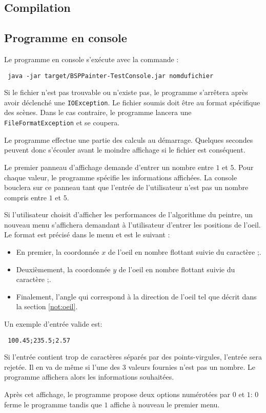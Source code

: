 \subsection{Compilation}
\subsection{Programme en console}
Le programme en console s'exécute avec la commande :
\begin{center}
  \texttt{
    java -jar target/BSPPainter-TestConsole.jar nomdufichier
  }
\end{center}

Si le fichier n'est pas trouvable ou n'existe pas, le programme
s'arrêtera après avoir déclenché une \texttt{IOException}.
Le fichier soumis doit être au format spécifique des scènes.
Dans le cas contraire, le programme lancera une \texttt{FileFormatException}
et se coupera.

Le programme effectue une partie des calculs au démarrage.
Quelques secondes peuvent donc s'écouler avant le moindre affichage
si le fichier est conséquent.

Le premier panneau d'affichage demande d'entrer un
nombre entre $1$ et $5$. Pour chaque valeur, le programme
spécifie les informations affichées.
La console bouclera sur ce panneau tant que
l'entrée de l'utilisateur n'est pas un nombre
compris entre $1$ et $5$.

Si l'utilisateur choisit d'afficher les performances de l'algorithme
du peintre, un nouveau menu s'affichera demandant à l'utilisateur
d'entrer les positions de l'oeil. Le format est précisé
dans le menu et est le suivant :
\begin{itemize}
\item En premier, la coordonnée $x$ de l'oeil en nombre
  flottant suivie du caractère \og;\fg{}.
\item Deuxièmement, la coordonnée $y$ de l'oeil en
  nombre flottant suivie du caractère \og;\fg.
\item Finalement, l'angle qui correspond à la direction
  de l'oeil tel que décrit dans la section \ref{not:oeil}.
\end{itemize}
Un exemple d'entrée valide est:
\begin{center}
  \texttt{
    100.45;235.5;2.57
  }
\end{center}

Si l'entrée contient trop de caractères séparés par des points-virgules,
l'entrée sera rejetée. Il en va de même si l'une des 3 valeurs fournies
n'est pas un nombre.
Le programme affichera alors les informations souhaitées.

Après cet affichage, le programme propose deux options numérotées par
$0$ et $1$: $0$ ferme le programme tandis que $1$ affiche à nouveau
le premier menu.

